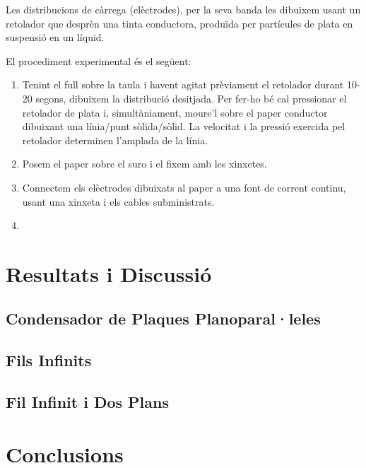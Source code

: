 \documentclass[a4paper,11pt]{report}
\begin{document}
	Les distribucions de càrrega (elèctrodes), per la seva banda les dibuixem usant un retolador que desprèn una tinta conductora, produïda per partícules de plata en suspensió en un líquid.  
	
	El procediment experimental és el següent:
	\begin{enumerate}
		\item Tenint el full sobre la taula i havent agitat prèviament el retolador durant 10-20 segons, dibuixem la distribució desitjada. Per fer-ho bé cal pressionar el retolador de plata i, simultàniament, moure'l sobre el paper conductor dibuixant una línia/punt sòlida/sòlid. La velocitat i la pressió exercida pel retolador determinen l'amplada de la línia.
		\item Posem el paper sobre el suro i el fixem amb les xinxetes.
		\item Connectem els elèctrodes dibuixats al paper a una font de corrent continu, usant una xinxeta i els cables subministrats.
		\item
	\end{enumerate}
	\section{Resultats i Discussió}
	\subsection{Condensador de Plaques Planoparal·leles}
	\subsection{Fils Infinits}
	
	\subsection{Fil Infinit i Dos Plans}
	
	\section{Conclusions}
	
	\newpage
	
	\appendix %
	
\end{document}
